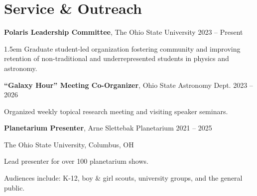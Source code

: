 \section*{Service \& Outreach}

\noindent
{\bf Polaris Leadership Committee}, The Ohio State University
\hfill 2023 -- Present

\vspace{-2pt}
\begin{adjustwidth}{1.5em}{}
Graduate student-led organization fostering community and improving retention of non-traditional and underrepresented students in physics and astronomy.
\end{adjustwidth}

\vspace{8pt}
\noindent
{\bf ``Galaxy Hour'' Meeting Co-Organizer}, Ohio State Astronomy Dept.
\hfill 2023 -- 2026

\nopagebreak

Organized weekly topical research meeting and visiting speaker seminars.



\vspace{8pt}
\noindent
{\bf Planetarium Presenter}, Arne Slettebak Planetarium 
\hfill 2021 -- 2025

The Ohio State University, Columbus, OH

Lead presenter for over 100 planetarium shows.

Audiences include: K-12, boy \& girl scouts, university groups, and the general public.


